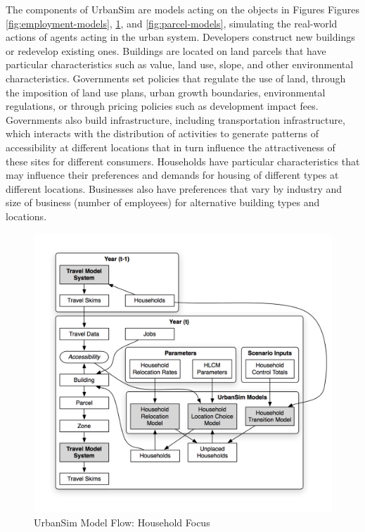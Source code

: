 The components of UrbanSim are models acting on the objects in Figures Figures \ref{fig:employment-models}, \ref{fig:household-models}, and \ref{fig:parcel-models}, simulating the real-world actions of agents acting in the urban system.  Developers construct new buildings or redevelop existing ones.  Buildings are located on land parcels that have particular characteristics such as value, land use, slope, and other environmental characteristics.  Governments set policies that regulate the use of land, through the imposition of land use plans, urban growth boundaries, environmental regulations, or through pricing policies such as development impact fees.  Governments also build infrastructure, including transportation infrastructure, which interacts with the distribution of activities to generate patterns of accessibility at different locations that in turn influence the attractiveness of these sites for different consumers.  Households have particular characteristics that may influence their preferences and demands for housing of different types at different locations.  Businesses also have preferences that vary by industry and size of business (number of employees) for alternative building types and locations.



\begin{figure}[ht]
\center
 \includegraphics[width=\textwidth]{graphics/ParcelHouseholdModel.png}
\caption{UrbanSim Model Flow: Household Focus}
\label{fig:household-models}
\end{figure}


